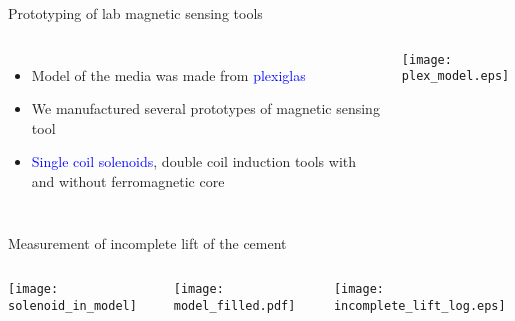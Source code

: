\documentclass[aspectratio=169]{beamer}
\begin{document}
\begin{frame}{Prototyping of lab magnetic sensing tools}

\begin{columns}[c] 


    
\begin{itemize}
\item Model of the media was made from \textcolor{blue} {plexiglas}
\item We manufactured several prototypes of magnetic sensing tool
\item \textcolor{blue} {Single coil solenoids}, double coil induction tools with and without ferromagnetic core
\end{itemize}


\texttt{[image: plex\_model.eps]}

\end{columns}



\end{frame}



\begin{frame}{Measurement of incomplete lift of the cement}

\begin{columns}[c] 


\centering
\texttt{[image: solenoid\_in\_model]}    
    


\centering
\texttt{[image: model\_filled.pdf]}

\centering
\texttt{[image: incomplete\_lift\_log.eps]}



\end{columns}

\end{frame}
\end{document}
